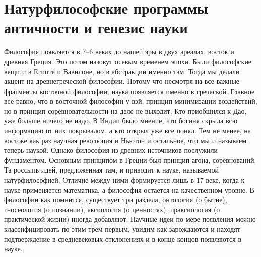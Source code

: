 \documentclass[a4paper, 12pt]{article}
\begin{document}

\section{Натурфилософские программы античности и генезис науки}

Философия появляется в 7--6 веках до нашей эры в двух ареалах, восток 
и древняя Греция. Это потом назовут осевым временем эпохи. Были 
философские вещи и в Египте и Вавилоне, но в абстракции именно там. 
Тогда мы делали акцент на древнегреческой философии. Потому что несмотря 
на все важные фрагменты восточной философии, наука появляется именно 
в греческой. Главное все равно, что в восточной философии у-вэй, принцип 
минимизации воздействий, но в принцип соревновательности на деле не 
выходит. Кто приобщился к Дао, уже больше ничего не надо. В Индии было 
мнение, что богиня скрыла всю информацию от них покрывалом, а кто открыл 
уже все понял. Тем не менее, на востоке как раз научная революция 
и Ньютон и остальное, что мы и называем теперь наукой. Однако философия 
из древних источников послужили фундаментом. Основным принципом в Греции 
был принцип агона, соревнований. Та россыпь идей, предложенная там, 
и приводит к науке, называемой натурфилософией. Отличие между ними 
формируется лишь в 17 веке, когда к науке применяется математика, 
а философия остается на качественном уровне. В философии как помнится, 
существует три раздела, онтология (о бытие), гносеология (о познании), 
аксиология (о ценностях), праксиология (о практической жизни) иногда 
добавляют. Научные идеи по мере появления можно классифицировать по этим 
трем первым, увидим как зарождаются и находят подтверждение 
в средневековых отклонениях и в конце концов появляются в науке.
\end{document}
